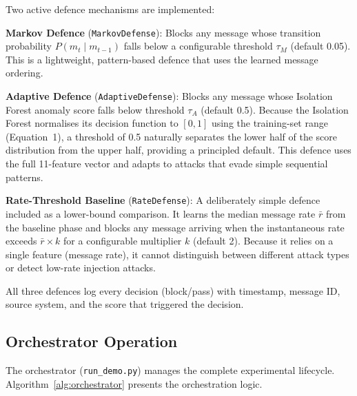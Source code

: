 Two active defence mechanisms are implemented:

\textbf{Markov Defence} (\texttt{MarkovDefense}):
Blocks any message whose transition probability $P(m_t \mid m_{t-1})$ falls below a configurable threshold $\tau_M$ (default 0.05).
This is a lightweight, pattern-based defence that uses the learned message ordering.

\textbf{Adaptive Defence} (\texttt{AdaptiveDefense}):
Blocks any message whose Isolation Forest anomaly score falls below threshold $\tau_A$ (default 0.5).
Because the Isolation Forest normalises its decision function to $[0, 1]$ using the training-set range (Equation~1), a threshold of 0.5 naturally separates the lower half of the score distribution from the upper half, providing a principled default.
This defence uses the full 11-feature vector and adapts to attacks that evade simple sequential patterns.

\textbf{Rate-Threshold Baseline} (\texttt{RateDefense}):
A deliberately simple defence included as a lower-bound comparison.
It learns the median message rate $\bar{r}$ from the baseline phase and blocks any message arriving when the instantaneous rate exceeds $\bar{r} \times k$ for a configurable multiplier $k$ (default 2).
Because it relies on a single feature (message rate), it cannot distinguish between different attack types or detect low-rate injection attacks.

All three defences log every decision (block/pass) with timestamp, message ID, source system, and the score that triggered the decision.

\subsection{Orchestrator Operation}

The orchestrator (\texttt{run\_demo.py}) manages the complete experimental lifecycle.
Algorithm~\ref{alg:orchestrator} presents the orchestration logic.

